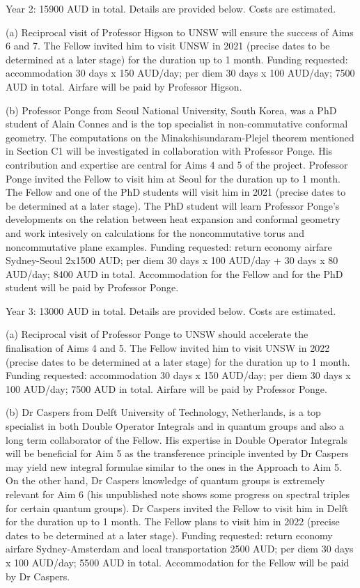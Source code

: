 \documentclass[12pt]{article}
\begin{document}
Year 2: 15900 AUD in total. Details are provided below. Costs are estimated.

(a) Reciprocal visit of Professor Higson to UNSW will ensure the success of Aims 6 and 7. The Fellow invited him to visit UNSW in 2021 (precise dates to be determined at a later stage) for the duration up to 1 month. Funding requested: accommodation 30 days x 150 AUD/day; per diem 30 days x 100 AUD/day; 7500 AUD in total. Airfare will be paid by Professor Higson.

(b) Professor Ponge from Seoul National University, South Korea, was a PhD student of Alain Connes and is the top specialist in non-commutative conformal geometry. The computations on the Minakshisundaram-Plejel theorem mentioned in Section C1 will be investigated in collaboration with Professor Ponge. His contribution and expertise are central for Aims 4 and 5 of the project. Professor Ponge invited the Fellow to visit him at Seoul for the duration up to 1 month. The Fellow and one of the PhD students will visit him in 2021 (precise dates to be determined at a later stage). The PhD student will learn Professor Ponge's developments on the relation between heat expansion and conformal geometry and work intesively on calculations for the noncommutative torus and noncommutative plane examples. Funding requested: return economy airfare Sydney-Seoul 2x1500 AUD; per diem 30 days x 100 AUD/day + 30 days x 80 AUD/day; 8400 AUD in total. Accommodation for the Fellow and for the PhD student will be paid by Professor Ponge.

Year 3: 13000 AUD in total. Details are provided below. Costs are estimated.

(a) Reciprocal visit of Professor Ponge to UNSW should accelerate the finalisation of Aims 4 and 5. The Fellow invited him to visit UNSW in 2022 (precise dates to be determined at a later stage) for the duration up to 1 month. Funding requested: accommodation 30 days x 150 AUD/day; per diem 30 days x 100 AUD/day; 7500 AUD in total. Airfare will be paid by Professor Ponge.

(b) Dr Caspers from Delft University of Technology, Netherlands, is a top specialist in both Double Operator Integrals and in quantum groups and also a long term collaborator of the Fellow. His expertise in Double Operator Integrals will be beneficial for Aim 5 as the transference principle invented by Dr Caspers may yield new integral formulae similar to the ones in the Approach to Aim 5. On the other hand, Dr Caspers knowledge of quantum groups is extremely relevant for Aim 6 (his unpublished note shows some progress on spectral triples for certain quantum groups). Dr Caspers invited the Fellow to visit him in Delft for the duration up to 1 month. The Fellow plans to visit him in 2022 (precise dates to be determined at a later stage). Funding requested: return economy airfare Sydney-Amsterdam  and local transportation 2500 AUD; per diem 30 days x 100 AUD/day; 5500 AUD in total. Accommodation for the Fellow will be paid by Dr Caspers.
\end{document}
